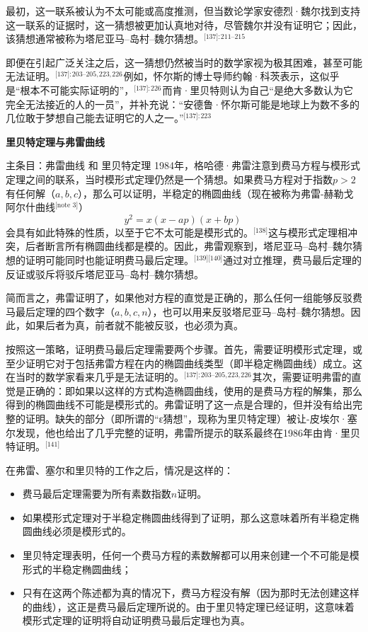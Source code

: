 最初，这一联系被认为不太可能或高度推测，但当数论学家安德烈·魏尔找到支持这一联系的证据时，这一猜想被更加认真地对待，尽管魏尔并没有证明它；因此，该猜想通常被称为塔尼亚马–岛村–魏尔猜想。\(^\text{[137]: 211–215  }\)

即便在引起广泛关注之后，这一猜想仍然被当时的数学家视为极其困难，甚至可能无法证明。\(^\text{[137]: 203–205, 223, 226}\) 例如，怀尔斯的博士导师约翰·科茨表示，这似乎是“根本不可能实际证明的”，\(^\text{[137]: 226}\) 而肯·里贝特则认为自己“是绝大多数认为它完全无法接近的人的一员”，并补充说：“安德鲁·怀尔斯可能是地球上为数不多的几位敢于梦想自己能去证明它的人之一。”\(^\text{[137]: 223 }\)

\textbf{里贝特定理与弗雷曲线}  

主条目：弗雷曲线 和 里贝特定理  
1984年，格哈德·弗雷注意到费马方程与模形式定理之间的联系，当时模形式定理仍然是一个猜想。如果费马方程对于指数\( p > 2 \)有任何解（\( a, b, c \)），那么可以证明，半稳定的椭圆曲线（现在被称为弗雷-赫勒戈阿尔什曲线\(^\text{[note 3]}\)）
\[
y^2 = x(x - ap)(x + bp)~
\]
会具有如此特殊的性质，以至于它不太可能是模形式的。\(^\text{[138]}\)这与模形式定理相冲突，后者断言所有椭圆曲线都是模的。因此，弗雷观察到，塔尼亚马–岛村–魏尔猜想的证明可能同时也能证明费马最后定理。\(^\text{[139][140]}\)通过对立推理，费马最后定理的反证或驳斥将驳斥塔尼亚马–岛村–魏尔猜想。

简而言之，弗雷证明了，如果他对方程的直觉是正确的，那么任何一组能够反驳费马最后定理的四个数字（\( a, b, c, n \)），也可以用来反驳塔尼亚马–岛村–魏尔猜想。因此，如果后者为真，前者就不能被反驳，也必须为真。

按照这一策略，证明费马最后定理需要两个步骤。首先，需要证明模形式定理，或至少证明它对于包括弗雷方程在内的椭圆曲线类型（即半稳定椭圆曲线）成立。这在当时的数学家看来几乎是无法证明的。\(^\text{[137]: 203–205, 223, 226}\) 其次，需要证明弗雷的直觉是正确的：即如果以这样的方式构造椭圆曲线，使用的是费马方程的解集，那么得到的椭圆曲线不可能是模形式的。弗雷证明了这一点是合理的，但并没有给出完整的证明。缺失的部分（即所谓的“ε猜想”，现称为里贝特定理）被让-皮埃尔·塞尔发现，他也给出了几乎完整的证明，弗雷所提示的联系最终在1986年由肯·里贝特证明。\(^\text{[141]}\)

在弗雷、塞尔和里贝特的工作之后，情况是这样的：
\begin{itemize}
\item 费马最后定理需要为所有素数指数\( n \)证明。
\item 如果模形式定理对于半稳定椭圆曲线得到了证明，那么这意味着所有半稳定椭圆曲线必须是模形式的。
\item 里贝特定理表明，任何一个费马方程的素数解都可以用来创建一个不可能是模形式的半稳定椭圆曲线；
\item 只有在这两个陈述都为真的情况下，费马方程没有解（因为那时无法创建这样的曲线），这正是费马最后定理所说的。由于里贝特定理已经证明，这意味着模形式定理的证明将自动证明费马最后定理也为真。
\end{itemize}
